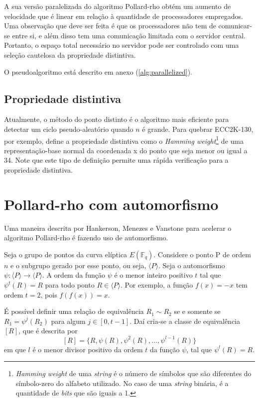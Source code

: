 A sua versão paralelizada do algoritmo Pollard-rho obtém um aumento de velocidade que é linear em relação à quantidade de processadores empregados. Uma observação que deve ser feita é que os processadores não tem de comunicar-se entre si, e além disso tem uma comunicação limitada com o servidor central. Portanto, o espaço total necessário no servidor pode ser controlado com uma seleção cautelosa da propriedade distintiva.

O pseudoalgoritmo está descrito em anexo (\ref{alg:parallelized}).

%
%
\subsection{Propriedade distintiva}
\label{sec:distinguished}
Atualmente, o método do ponto distinto é o algoritmo mais eficiente para detectar um ciclo pseudo-aleatório quando \(n\) é grande. Para quebrar ECC2K-130, por exemplo, \cite{Bailey:2009} define a propriedade distintiva como o \textit{Hamming weight}\footnote{\textit{Hamming weight} de uma \textit{string} é o número de símbolos que são diferentes do símbolo-zero do alfabeto utilizado. No caso de uma \textit{string} binária, é a quantidade de \textit{bits} que são iguais a 1.} de uma representação-base normal da coordenada x do ponto que seja menor ou igual a 34. Note que este tipo de definição permite uma rápida verificação para a propriedade distintiva.

%
%
\section{Pollard-rho com automorfismo}

Uma maneira descrita por Hankerson, Menezes e Vanstone para acelerar o algoritmo Pollard-rho é fazendo uso de automorfismo.\cite{Guide}

Seja o grupo de pontos da curva elíptica $E(\mathbb{F}_q)$. Considere o ponto P de ordem \(n\) e o subgrupo gerado por esse ponto, ou seja, $\langle P \rangle$. Seja o automorfismo $\psi: \langle P \rangle \to \langle P \rangle$. A ordem da função $\psi$ é o menor inteiro positivo $t$ tal que $\psi^t(R) = R$ para todo ponto $R \in \langle P \rangle$. Por exemplo, a função $f(x) = -x$ tem ordem $t = 2$, pois $f(f(x)) = x$.

É possível definir uma relação de equivalência $R_1 \sim R_2$ se e somente se $R_1 = \psi^j(R_2)$ para algum $j \in [0, t - 1]$. Daí cria-se a classe de equivalência $[R]$, que é descrita por
$$
[R] = \{R, \psi(R), \psi^2(R), \dots, \psi^{l-1}(R)\}
$$
em que $l$ é o menor divisor positivo da ordem $t$ da função $\psi$, tal que $\psi^l(R) = R$.


